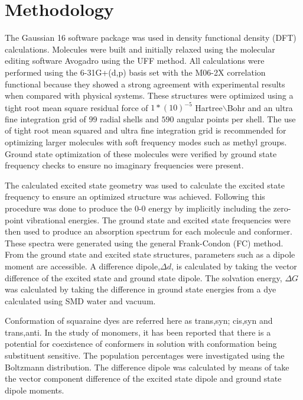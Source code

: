 \documentclass[journal=jacsat,manuscript=article]{achemso}
\begin{document}
\section{Methodology}
The Gaussian 16 software package\cite{g16}⁠ was used in density functional density (DFT) calculations. Molecules were built and initially relaxed using the molecular editing software Avogadro\cite{Hanwell2012Avogadro:Platform}⁠ using the UFF\cite{Rappe1992UFFSimulations}⁠ method. All calculations were performed using the 6-31G+(d,p) basis set with the M06-2X\cite{Zhao2008TheFunction}⁠ correlation functional because they showed a strong agreement with experimental results when compared with physical systems\citep{Jacquemin2016Excited-StateCC2,Jacquemin20150-0Compounds}. These structures were optimized using a tight root mean square residual force of $1*(10)^{-5}$  Hartree$\backslash$Bohr and an ultra fine integration grid of $99$ radial shells and $590$ angular points per shell. The use of tight root mean squared and ultra fine integration grid is recommended for optimizing larger molecules with soft frequency modes such as methyl groups\cite{AzaisTestingSuper-Resolution}. Ground state optimization of these molecules were verified by ground state frequency checks to ensure no imaginary frequencies were present.

The calculated excited state geometry was used to calculate the excited state frequency to ensure an optimized structure was achieved. Following this procedure was done to produce the 0-0 energy by implicitly including the zero-point vibrational energies\cite{Adamo2013TheTheory}. The ground state and excited state frequencies were then used to produce an absorption spectrum for each molecule and conformer. These spectra were generated using the general Frank-Condon (FC) method. From the ground state and excited state structures, parameters such as a dipole moment are accessible. A difference dipole,$\Delta d$, is calculated by taking the vector difference of the excited state and ground state dipole. The solvation energy, $\Delta G$ was calculated by taking the difference in ground state energies from a dye calculated using SMD\cite{Marenich2009UniversalTensions} water and vacuum.

Conformation of squaraine dyes are referred here as trans,syn; cis,syn and trans,anti. In the study of monomers, it has been reported that there is a potential for coexistence of conformers in solution with conformation being substituent sensitive\citep{Kolosova2019MolecularSquaraines,Rohr2018ExcitonDimers}⁠. The population percentages were investigated using the Boltzmann distribution.
The difference dipole was calculated by means of take the vector component difference of the excited state dipole and ground state dipole moments.
\end{document}
